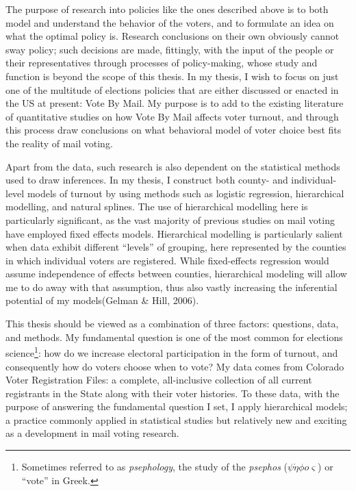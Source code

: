 \documentclass[12pt,twoside]{reedthesis}
\begin{document}
  The purpose of research into policies like the ones described above is
  to both model and understand the behavior of the voters, and to
  formulate an idea on what the optimal policy is. Research conclusions on
  their own obviously cannot sway policy; such decisions are made,
  fittingly, with the input of the people or their representatives through
  processes of policy-making, whose study and function is beyond the scope
  of this thesis. In my thesis, I wish to focus on just one of the
  multitude of elections policies that are either discussed or enacted in
  the US at present: Vote By Mail. My purpose is to add to the existing
  literature of quantitative studies on how Vote By Mail affects voter
  turnout, and through this process draw conclusions on what behavioral
  model of voter choice best fits the reality of mail voting.
  
  Apart from the data, such research is also dependent on the statistical
  methods used to draw inferences. In my thesis, I construct both county-
  and individual-level models of turnout by using methods such as logistic
  regression, hierarchical modelling, and natural splines. The use of
  hierarchical modelling here is particularly significant, as the vast
  majority of previous studies on mail voting have employed fixed effects
  models. Hierarchical modelling is particularly salient when data exhibit
  different ``levels'' of grouping, here represented by the counties in
  which individual voters are registered. While fixed-effects regression
  would assume independence of effects between counties, hierarchical
  modeling will allow me to do away with that assumption, thus also vastly
  increasing the inferential potential of my models(Gelman \& Hill, 2006).
  
  This thesis should be viewed as a combination of three factors:
  questions, data, and methods. My fundamental question is one of the most
  common for elections science\footnote{Sometimes referred to as
    \emph{psephology}, the study of the \emph{psephos}
    (\(\psi \acute \eta \phi o \varsigma\)) or ``vote'' in Greek.}: how do
  we increase electoral participation in the form of turnout, and
  consequently how do voters choose when to vote? My data comes from
  Colorado Voter Registration Files: a complete, all-inclusive collection
  of all current registrants in the State along with their voter
  histories. To these data, with the purpose of answering the fundamental
  question I set, I apply hierarchical models; a practice commonly applied
  in statistical studies but relatively new and exciting as a development
  in mail voting research.
  
\end{document}
